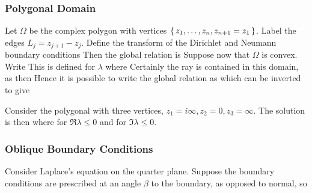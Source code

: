 \documentclass{article}
\begin{document}
\subsubsection{Polygonal Domain}
Let $\Omega$ be the complex polygon with vertices $\set{z_1,\dots, z_n, z_{n+1} = z_1}$. Label the edges $L_j = z_{j+1}-z_j$. Define the transform of the Dirichlet and Neumann boundary conditions
Then the global relation is 
Suppose now that $\Omega$ is convex. Write 
This is defined for $\lambda$ where
Certainly the ray 
is contained in this domain, as then 
Hence it is possible to write the global relation as 
which can be inverted to give

\begin{example}
Consider the polygonal with three vertices, $z_1 = i\infty, z_2 = 0, z_3 = \infty$. The solution is then 
where 
for $\Re \lambda \leq 0 $ and 
for $\Im \lambda \leq 0$. 
\end{example}

\subsubsection{Oblique Boundary Conditions}
Consider Laplace's equation on the quarter plane. Suppose the boundary conditions are prescribed at an angle $\beta$ to the boundary, as opposed to normal, so 
\end{document}
